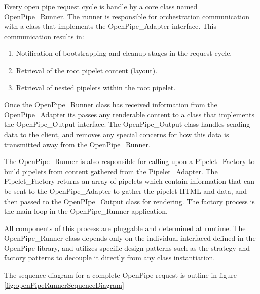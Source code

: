 \documentclass[12pt]{report}
\begin{document}
Every open pipe request cycle is handle by a core class named OpenPipe\_Runner. The runner is responsible for orchestration communication with a class that implements the OpenPipe\_Adapter interface. This communication results in:

\begin{enumerate}
\item Notification of bootstrapping and cleanup stages in the request cycle.
\item Retrieval of the root pipelet content (layout).
\item Retrieval of nested pipelets within the root pipelet.
\end{enumerate}

Once the OpenPipe\_Runner class has received information from the OpenPipe\_Adapter its passes any renderable content to a class that implements the OpenPipe\_Output interface. The OpenPipe\_Output class handles sending data to the client, and removes any special concerns for how this data is transmitted away from the OpenPipe\_Runner.

The OpenPipe\_Runner is also responsible for calling upon a Pipelet\_Factory to build pipelets from content gathered from the Pipelet\_Adapter. The Pipelet\_Factory returns an array of pipelets which contain information that can be sent to the OpenPipe\_Adapter to gather the pipelet HTML and data, and then passed to the OpenPIpe\_Output class for rendering. The factory process is the main loop in the OpenPipe\_Runner application.

All components of this process are pluggable and determined at runtime. The OpenPipe\_Runner class depends only on the individual interfaced defined in the OpenPipe library, and utilizes specific design patterns such as the strategy and factory patterns to decouple it directly from any class instantiation.

The sequence diagram for a complete OpenPipe request is outline in figure \ref{fig:openPipeRunnerSequenceDiagram}
\end{document}
